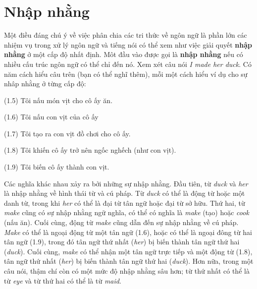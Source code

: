 \section{Nhập nhằng}

Một điều đáng chú ý về việc phân chia các tri thức về ngôn ngữ là phần lớn các nhiệm vụ trong xử lý ngôn ngữ và tiếng nói có thể xem như việc giải quyết \textbf{nhập nhằng} ở một cấp độ nhất định. Môt đầu vào được gọi là \textbf{nhập nhằng} nếu có nhiều cấu trúc ngôn ngữ có thể chỉ đến nó. Xem xét câu nói \textit{I made her duck}. Có năm cách hiểu câu trên (bạn có thể nghĩ thêm), mỗi một cách hiểu ví dụ cho sự nhâp nhằng ở từng cấp độ:

\noindent
(1.5) Tôi nấu món vịt cho cô ấy ăn.

\noindent
(1.6) Tôi nấu con vịt của cô ấy

\noindent
(1.7) Tôi tạo ra con vịt đồ chơi cho cô ấy.

\noindent
(1.8) Tôi khiến cô ấy trở nên ngốc nghếch (như con vịt).

\noindent
(1.9) Tôi biến cô ấy thành con vịt.

Các nghĩa khác nhau xảy ra bởi những sự nhập nhằng. Đầu tiên, từ \textit{duck} và \textit{her} là nhập nhằng về hình thái từ và cú pháp. Từ \textit{duck} có thể là động từ hoặc một danh từ, trong khi \textit{her} có thể là đại từ tân ngữ hoặc đại từ sở hữu. Thứ hai, từ \textit{make} cũng có sự nhập nhằng ngữ nghĩa, có thể có nghĩa là \textit{make} (tạo) hoặc \textit{cook} (nấu ăn). Cuối cùng, động từ \textit{make} cũng dẫn đến sự nhập nhằng về cú pháp. \textit{Make} có thể là ngoại động từ một tân ngữ (1.6), hoặc có thể là ngoại đông từ hai tân ngữ (1.9), trong đó tân ngữ thứ nhất (\textit{her}) bị biến thành tân ngữ thứ hai (\textit{duck}). Cuối cùng, \textit{make} có thể nhận một tân ngữ trực tiếp và một động từ (1.8), tân ngữ thứ nhất (\textit{her}) bị biến thành tân ngữ thứ hai (\textit{duck}). Hơn nữa, trong một câu nói, thậm chí còn có một mức độ nhập nhằng sâu hơn; từ thứ nhất có thể là từ \textit{eye} và từ thứ hai có thể là từ \textit{maid}.

